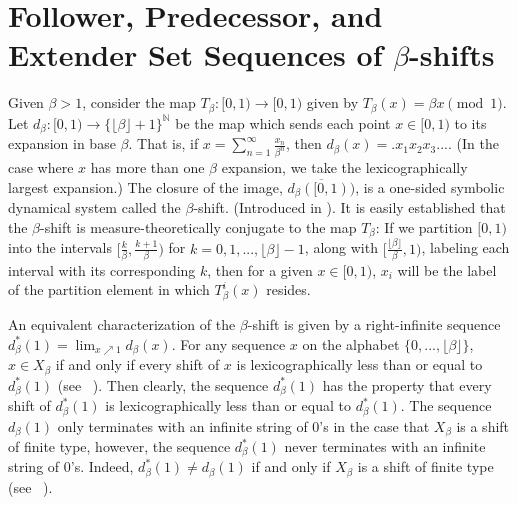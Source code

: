 \documentclass{amsart}
\theoremstyle{definition}
\newtheorem{definition}[theorem]{Definition}
\numberwithin{equation}{section}
\begin{document}


\section{Follower, Predecessor, and Extender Set Sequences of $\beta$-shifts}
\label{Beta}

Given $\beta > 1$, consider the map $T_\beta: [0,1) \rightarrow [0,1)$ given by $T_\beta(x) = \beta x \pmod 1$. Let $d_\beta:[0,1) \rightarrow \{ \lfloor \beta \rfloor +1\}^\mathbb{N}$ be the map which sends each point $x \in [0,1)$ to its expansion in base $\beta$. That is, if $\displaystyle x = \sum_{n=1}^\infty \frac{x_n}{\beta^n}$, then $d_\beta(x) = .x_1x_2x_3...$. (In the case where $x$ has more than one $\beta$ expansion, we take the lexicographically largest expansion.) The closure of the image, $\overline{d_\beta([0,1))}$, is a one-sided symbolic dynamical system called the $\beta$-shift. (Introduced in \cite{Renyi}). It is easily established that the $\beta$-shift is measure-theoretically conjugate to the map $T_\beta$: If we partition $[0,1)$ into the intervals $[\frac{k}{\beta}, \frac{k+1}{\beta})$ for $k = 0, 1, ... , \lfloor \beta \rfloor -1$, along with $[\frac{\lfloor \beta \rfloor}{\beta} , 1)$, labeling each interval with its corresponding $k$, then for a given $x \in [0,1)$, $x_i$ will be the label of the partition element in which $T_\beta^i(x)$ resides. %

An equivalent characterization of the $\beta$-shift is given by a right-infinite sequence $d_\beta^* (1) = \displaystyle \lim_{x \nearrow 1} d_\beta(x)$. For any sequence $x$ on the alphabet $\{0, ..., \lfloor \beta \rfloor \}$, $x \in X_\beta$ if and only if every shift of $x$ is lexicographically less than or equal to $d_\beta^* (1)$ (see ~\cite{Parry}). Then clearly, the sequence $d_\beta^* (1)$ has the property that every shift of $d_\beta^* (1)$ is lexicographically less than or equal to $d_\beta^* (1)$. The sequence $d_\beta(1)$ only terminates with an infinite string of 0's in the case that $X_\beta$ is a shift of finite type, however, the sequence $d_\beta^*(1)$ never terminates with an infinite string of 0's. Indeed, $d_\beta^*(1) \neq d_\beta(1)$ if and only if $X_\beta$ is a shift of finite type (see ~\cite{Blanchard}).
\end{document}
